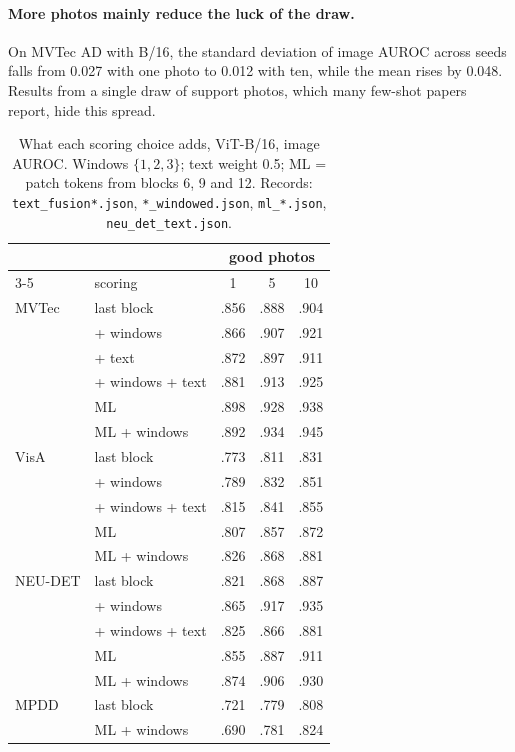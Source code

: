 \documentclass[10pt,twocolumn]{article}
\begin{document}
\paragraph{More photos mainly reduce the luck of the draw.} On MVTec AD with B/16,
the standard deviation of image AUROC across seeds falls from 0.027 with one photo
to 0.012 with ten, while the mean rises by 0.048. Results from a single draw of
support photos, which many few-shot papers report, hide this spread.

\begin{table}[t]
\centering\small
\caption{What each scoring choice adds, ViT-B/16, image AUROC. Windows
$\{1,2,3\}$; text weight 0.5; ML = patch tokens from blocks 6, 9 and 12.
Records: \texttt{text\_fusion*.json}, \texttt{*\_windowed.json},
\texttt{ml\_*.json}, \texttt{neu\_det\_text.json}.}
\label{tab:ablation}
\setlength{\tabcolsep}{4pt}
\begin{tabular}{llccc}
\toprule
 & & \multicolumn{3}{c}{good photos} \\
\cmidrule(lr){3-5}
 & scoring & 1 & 5 & 10 \\
\midrule
MVTec & last block & .856 & .888 & .904 \\
      & + windows & .866 & .907 & .921 \\
      & + text & .872 & .897 & .911 \\
      & + windows + text & .881 & .913 & .925 \\
      & ML & .898 & .928 & .938 \\
      & ML + windows & .892 & .934 & .945 \\
\midrule
VisA  & last block & .773 & .811 & .831 \\
      & + windows & .789 & .832 & .851 \\
      & + windows + text & .815 & .841 & .855 \\
      & ML & .807 & .857 & .872 \\
      & ML + windows & .826 & .868 & .881 \\
\midrule
NEU-DET & last block & .821 & .868 & .887 \\
      & + windows & .865 & .917 & .935 \\
      & + windows + text & .825 & .866 & .881 \\
      & ML & .855 & .887 & .911 \\
      & ML + windows & .874 & .906 & .930 \\
\midrule
MPDD  & last block & .721 & .779 & .808 \\
      & ML + windows & .690 & .781 & .824 \\
\bottomrule
\end{tabular}
\end{table}
\end{document}
